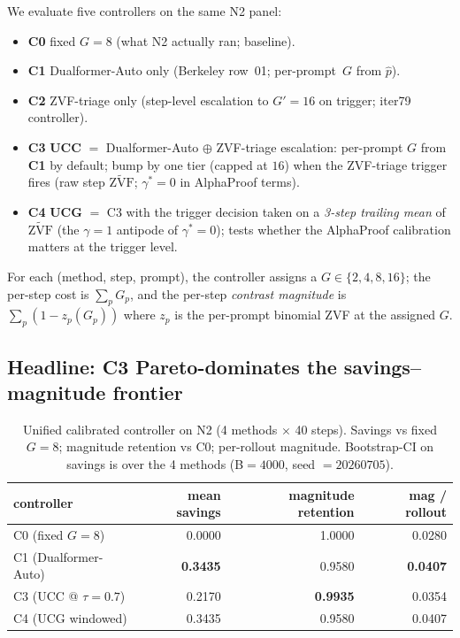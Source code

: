 \documentclass{article}
\newcommand{\zvf}{\ensuremath{\widetilde{\mathrm{ZVF}}}}
\begin{document}
We evaluate five controllers on the same N2 panel:
\begin{itemize}
\item \textbf{C0} fixed $G{=}8$ (what N2 actually ran; baseline).
\item \textbf{C1} Dualformer-Auto only (Berkeley row~01; per-prompt~$G$
from $\hat p$).
\item \textbf{C2} ZVF-triage only (step-level escalation to $G'{=}16$ on
trigger; iter79 controller).
\item \textbf{C3} \textbf{UCC} $=$ Dualformer-Auto $\oplus$ ZVF-triage
escalation: per-prompt $G$ from \textbf{C1} by default; bump by one tier
(capped at $16$) when the ZVF-triage trigger fires (raw step $\zvf$;
$\gamma^*{=}0$ in AlphaProof terms).
\item \textbf{C4} \textbf{UCG} $=$ C3 with the trigger decision taken on a
\emph{3-step trailing mean} of $\zvf$ (the $\gamma{=}1$ antipode of
$\gamma^*{=}0$); tests whether the AlphaProof calibration matters at the
trigger level.
\end{itemize}

For each (method, step, prompt), the controller assigns a $G \in \{2,4,8,16\}$;
the per-step cost is $\sum_p G_p$, and the per-step
\emph{contrast magnitude} is $\sum_p (1 - z_{p}(G_p))$ where $z_p$ is
the per-prompt binomial ZVF at the assigned $G$.

\subsection{Headline: C3 Pareto-dominates the savings--magnitude frontier}

\begin{table}[t]
\centering\small
\caption{Unified calibrated controller on N2 (4 methods $\times$ 40 steps).
Savings vs fixed $G{=}8$; magnitude retention vs C0; per-rollout magnitude.
Bootstrap-CI on savings is over the 4 methods (B$=4000$, seed $=20260705$).}
\label{tab:p7-iter103-headline}
\vspace{2pt}
\begin{tabular}{lrrr}
\toprule
controller & mean savings & magnitude retention & mag / rollout \\
\midrule
C0 (fixed $G{=}8$)        &  0.0000 & 1.0000 & 0.0280 \\
C1 (Dualformer-Auto)      &  \textbf{0.3435} & 0.9580 & \textbf{0.0407} \\
C3 (UCC @ $\tau{=}0.7$)    &  0.2170 & \textbf{0.9935} & 0.0354 \\
C4 (UCG windowed)         &  0.3435 & 0.9580 & 0.0407 \\
\bottomrule
\end{tabular}
\end{table}
\end{document}
